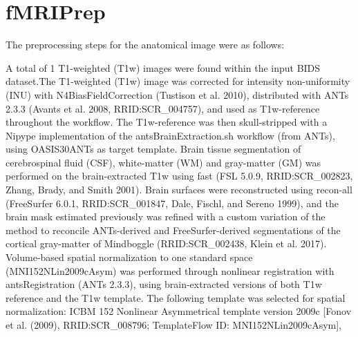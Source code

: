 \section{fMRIPrep}

The preprocessing steps for the anatomical image were as follows:

A total of 1 T1-weighted (T1w) images were found within the input BIDS dataset.The T1-weighted (T1w) image was corrected for intensity non-uniformity (INU) with N4BiasFieldCorrection (Tustison et al. 2010), distributed with ANTs 2.3.3 (Avants et al. 2008, RRID:SCR\_004757), and used as T1w-reference throughout the workflow. The T1w-reference was then skull-stripped with a Nipype implementation of the antsBrainExtraction.sh workflow (from ANTs), using OASIS30ANTs as target template. Brain tissue segmentation of cerebrospinal fluid (CSF), white-matter (WM) and gray-matter (GM) was performed on the brain-extracted T1w using fast (FSL 5.0.9, RRID:SCR\_002823, Zhang, Brady, and Smith 2001). Brain surfaces were reconstructed using recon-all (FreeSurfer 6.0.1, RRID:SCR\_001847, Dale, Fischl, and Sereno 1999), and the brain mask estimated previously was refined with a custom variation of the method to reconcile ANTs-derived and FreeSurfer-derived segmentations of the cortical gray-matter of Mindboggle (RRID:SCR\_002438, Klein et al. 2017). Volume-based spatial normalization to one standard space (MNI152NLin2009cAsym) was performed through nonlinear registration with antsRegistration (ANTs 2.3.3), using brain-extracted versions of both T1w reference and the T1w template. The following template was selected for spatial normalization: ICBM 152 Nonlinear Asymmetrical template version 2009c [Fonov et al. (2009), RRID:SCR\_008796; TemplateFlow ID: MNI152NLin2009cAsym],


